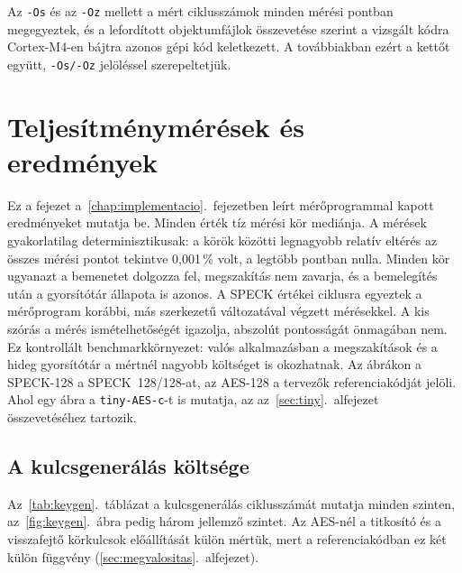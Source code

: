 \documentclass[a4paper,12pt]{report}
\theoremstyle{definition}
\theoremstyle{remark}
\begin{document}
Az \texttt{-Os} és az \texttt{-Oz} mellett a mért ciklusszámok minden mérési pontban megegyeztek, és a lefordított objektumfájlok összevetése szerint a vizsgált kódra Cortex-M4-en bájtra azonos gépi kód keletkezett. A továbbiakban ezért a kettőt együtt, \texttt{-Os/-Oz} jelöléssel szerepeltetjük.

\chapter{Teljesítménymérések és eredmények}\label{chap:meresek}

Ez a fejezet a~\ref{chap:implementacio}.~fejezetben leírt mérőprogrammal kapott eredményeket mutatja be. Minden érték tíz mérési kör mediánja. A mérések gyakorlatilag determinisztikusak: a körök közötti legnagyobb relatív eltérés az összes mérési pontot tekintve 0,001\,\% volt, a legtöbb pontban nulla. Minden kör ugyanazt a bemenetet dolgozza fel, megszakítás nem zavarja, és a bemelegítés után a gyorsítótár állapota is azonos. A SPECK értékei ciklusra egyeztek a mérőprogram korábbi, más szerkezetű változatával végzett mérésekkel. A kis szórás a mérés ismételhetőségét igazolja, abszolút pontosságát önmagában nem. Ez kontrollált benchmarkkörnyezet: valós alkalmazásban a megszakítások és a hideg gyorsítótár a mértnél nagyobb költséget is okozhatnak. Az ábrákon a SPECK-128 a SPECK~128/128-at, az AES-128 a tervezők referenciakódját jelöli. Ahol egy ábra a \texttt{tiny-AES-c}-t is mutatja, az az~\ref{sec:tiny}.~alfejezet összevetéséhez tartozik.

\section{A kulcsgenerálás költsége}\label{sec:keygen}

Az~\ref{tab:keygen}.~táblázat a kulcsgenerálás ciklusszámát mutatja minden szinten, az~\ref{fig:keygen}.~ábra pedig három jellemző szintet. Az AES-nél a titkosító és a visszafejtő körkulcsok előállítását külön mértük, mert a referenciakódban ez két külön függvény (\ref{sec:megvalositas}.~alfejezet).
\end{document}
